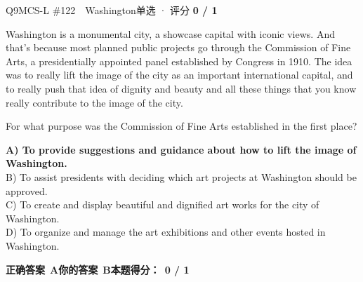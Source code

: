 \begin{qblock}{Q9\quad MCS-L \#122\ \ Washington}{单选 · 评分 \textcolor{cAccent}{\bfseries 0 / 1}}
\begin{promptbox}
Washington is a monumental city, a showcase capital with iconic views. And that's because most planned public projects go through the Commission of Fine Arts, a presidentially appointed panel established by Congress in 1910. The idea was to really lift the image of the city as an important international capital, and to really push that idea of dignity and beauty and all these things that you know really contribute to the image of the city.
\end{promptbox}
\begin{notebox}For what purpose was the Commission of Fine Arts established in the first place?\end{notebox}
{\small
{\color{cFix}\textbf{A) To provide suggestions and guidance about how to lift the image of Washington.}}\\
B) To assist presidents with deciding which art projects at Washington should be approved.\\
C) To create and display beautiful and dignified art works for the city of Washington.\\
D) To organize and manage the art exhibitions and other events hosted in Washington.}
\par\smallskip
\textbf{正确答案}\ \textcolor{cFix}{\bfseries A}\qquad\textbf{你的答案}\ {\color{cWrong}\bfseries B}\qquad\textbf{本题得分：}\ {\color{cAccent}\bfseries 0 / 1}
\end{qblock}

